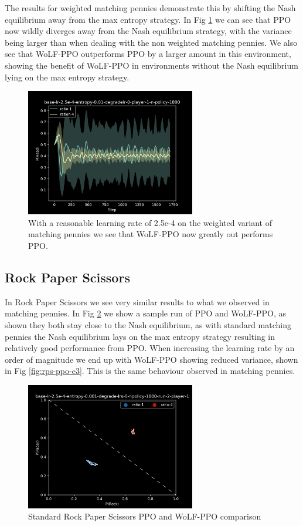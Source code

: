 \documentclass{article}
\begin{document}
The results for weighted matching pennies demonstrate this by shifting the Nash equilibrium away from the max entropy strategy. In Fig \ref{fig:weighted-mp-ppo-e4} we can see that PPO now wildly diverges away from the Nash equilibrium strategy, with the variance being larger than when dealing with the non weighted matching pennies. We also see that WoLF-PPO outperforms PPO by a larger amount in this environment, showing the benefit of WoLF-PPO in environments without the Nash equilibrium lying on the max entropy strategy.

\begin{figure}
    \centering
    \includegraphics[width=20em]{Figures/weighted-mp-ppo-e4.png}
    \caption{With a reasonable learning rate of 2.5e-4 on the weighted variant of matching pennies we see that WoLF-PPO now greatly out performs PPO.}
    \label{fig:weighted-mp-ppo-e4}
\end{figure}

\subsection{Rock Paper Scissors}

In Rock Paper Scissors we see very similar results to what we observed in matching pennies. In Fig \ref{fig:rps-ppo-e4} we show a sample run of PPO and WoLF-PPO, as shown they both stay close to the Nash equilibrium, as with standard matching pennies the Nash equilibrium lays on the max entropy strategy resulting in relatively good performance from PPO. When increasing the learning rate by an order of magnitude we end up with WoLF-PPO showing reduced variance, shown in Fig \ref{fig:rps-ppo-e3}. This is the same behaviour observed in matching pennies.

\begin{figure}
    \centering
    \includegraphics[width=20em]{Figures/rps-ppo-e4.png}
    \caption{Standard Rock Paper Scissors PPO and WoLF-PPO comparison}
    \label{fig:rps-ppo-e4}
\end{figure}
\end{document}
